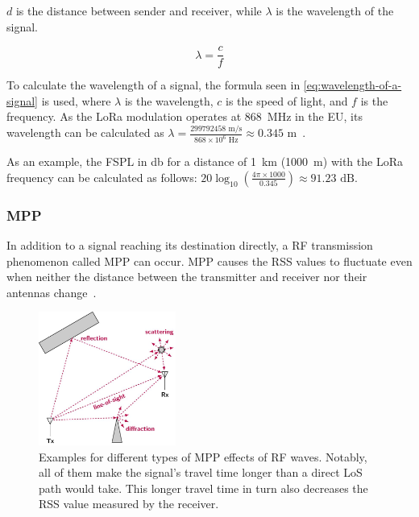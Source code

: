 $d$ is the distance between sender and receiver, while $\lambda$ is the wavelength of the signal.

\begin{equation}\label{eq:wavelength-of-a-signal}
    \lambda = \frac{c}{f}
\end{equation}

To calculate the wavelength of a signal, the formula seen in \cref{eq:wavelength-of-a-signal} is used, where $\lambda$ is the wavelength, $c$ is the speed of light, and $f$ is the frequency.
As the \ac{LoRa} modulation operates at \SI{868}{\mega\hertz} in the \ac{EU}, its wavelength can be calculated as $\lambda = \frac{299792458 \text{ m/s}}{868 \times 10^6 \text{ Hz}} \approx 0.345 \text{ m}$~\cite{lora_alliance_inc_lorawan_regional_2017}.

As an example, the \acl{FSPL} in \si{\decibel} for a distance of \SI{1}{\kilo\metre} (\SI{1000}{\metre}) with the \ac{LoRa} frequency can be calculated as follows: $20 \log_{10}\left(\frac{4 \pi \times 1000}{0.345}\right) \approx 91.23 \text{ dB}$.

\subsubsection{\acf{MPP}}\label{sec:multipath-propagation}

In addition to a signal reaching its destination directly, a \ac{RF} transmission phenomenon called \acf{MPP} can occur.
\acl{MPP} causes the \ac{RSS} values to fluctuate even when neither the distance between the transmitter and receiver nor their antennas change~\cite[p. 136]{abdelfadeel_how_2019}.

\begin{figure}[htbp]
    \centering
    \includegraphics[width=0.4\textwidth]{pictures/diagrams_figures/multipath_propagation.jpg}
    \caption{
        Examples for different types of \acf{MPP} effects of \ac{RF} waves.
        Notably, all of them make the signal's travel time longer than a direct \ac{LoS} path would take.
        This longer travel time in turn also decreases the \ac{RSS} value measured by the receiver.~\protect\cite{milosevic_key_2017}
    }\label{pic:figure_multipath_propagation}
\end{figure}

